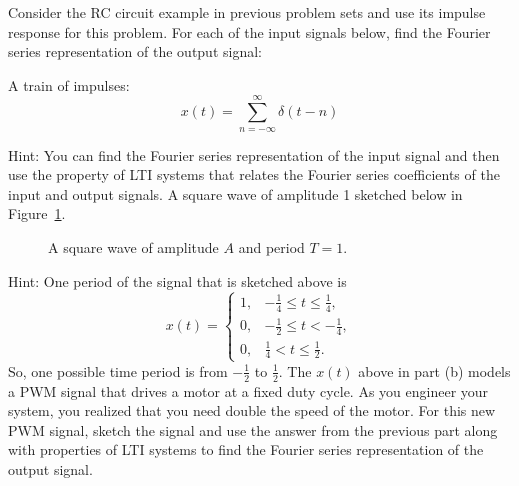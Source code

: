 \documentclass{ee102_pset}
\author{\rule{3cm}{0.4pt}} %
\begin{document}
Consider the RC circuit example in previous problem sets and use its impulse response for this problem. For each of the input signals below, find the Fourier series representation of the output signal:

\problempart[20 points] A train of impulses:
\[
x(t) = \sum_{n=-\infty}^{\infty} \delta(t - n)
\]

Hint: You can find the Fourier series representation of the input signal and then use the property of LTI systems that relates the Fourier series coefficients of the input and output signals.
\problempart[20 points] A square wave of amplitude 1 sketched below in Figure~\ref{fig:square_wave}. 
\begin{figure}[h]
  \centering
\caption{A square wave of amplitude $A$ and period $T=1$.}
\label{fig:square_wave}


\end{figure}

Hint: One period of the signal that is sketched above is \[
x(t) = \begin{cases}
1, & -\tfrac{1}{4} \le t \le \tfrac{1}{4},\\
0, & -\tfrac{1}{2} \le t < -\tfrac{1}{4},\\
0, & \tfrac{1}{4} < t \le \tfrac{1}{2}.
\end{cases}
\]
So, one possible time period is from $-\tfrac{1}{2}$ to $\tfrac{1}{2}$.
\problempart[20 points] The $x(t)$ above in part (b) models a PWM signal that drives a motor at a fixed duty cycle. As you engineer your system, you realized that you need double the speed of the motor. For this new PWM signal, sketch the signal and use the answer from the previous part along with properties of LTI systems to find the Fourier series representation of the output signal.
\end{document}
